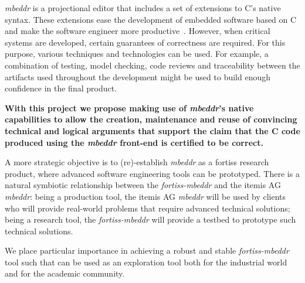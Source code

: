 \emph{mbeddr} is a projectional editor that includes a set of extensions to C's
native syntax. These extensions ease the development of embedded software based
on C and make the software engineer more
productive~\cite{VoelterRKS13}.
However, when critical systems are developed, certain guarantees of correctness
are required. For this purpose, various techniques and technologies
can be used. For example, a combination of testing, model checking, code
reviews and traceability between the artifacts used throughout the development
might be used to build enough confidence in the final product.

\vspace{2mm}
\noindent
\textbf{With this project we propose making use of \emph{mbeddr}'s native capabilities
to allow the creation, maintenance and reuse of convincing technical and logical
arguments that support the claim that the C code produced using the
\emph{mbeddr} front-end is certified to be correct.} 

\vspace{2mm}
\noindent
A more strategic objective
is to (re)-establish \emph{mbeddr} as a fortiss research product, where advanced
software engineering tools can be prototyped. There is a natural symbiotic
relationship between the \emph{fortiss-mbeddr}
and the itemis AG \emph{mbeddr}:
being a production tool, the itemis AG \emph{mbeddr} will be used by
clients who will provide real-world problems that require advanced technical
solutions; being a research tool, the \emph{fortiss-mbeddr} will provide a
testbed to prototype such technical solutions.

We place particular importance in achieving a robust and stable
\emph{fortiss-mbeddr} tool such that can be used as an exploration tool both for
the industrial world and for the academic community.